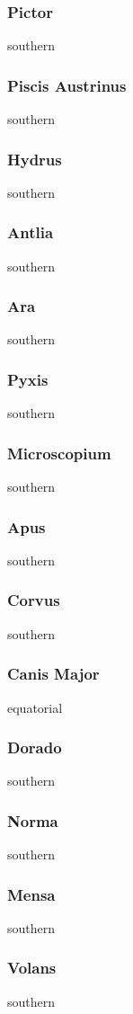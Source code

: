 \subsubsection{Pictor}
southern
\subsubsection{Piscis Austrinus}
southern
\subsubsection{Hydrus}
southern
\subsubsection{Antlia}
southern
\subsubsection{Ara}
southern
\subsubsection{Pyxis}
southern
\subsubsection{Microscopium}
southern
\subsubsection{Apus}
southern
\subsubsection{Corvus}
southern
\subsubsection{Canis Major}
equatorial
\subsubsection{Dorado}
southern
\subsubsection{Norma}
southern
\subsubsection{Mensa}
southern
\subsubsection{Volans}
southern
